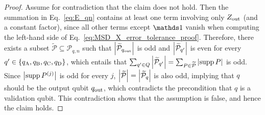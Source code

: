\documentclass[
 prx,
 reprint,
 superscriptaddress,
 longbibliography,
 dvipsnames
]{revtex4-2}
\begin{document}
\begin{proof}
    Assume for contradiction that the claim does not hold.
    Then the summation in Eq.~\eqref{eq:E_qn} contains at least one term involving only $Z_{\mathrm{out}}$ (and a constant factor), since all other terms except $\identity$ vanish when computing the left-hand side of Eq.~\eqref{eq:MSD_X_error_tolerance_proof}.
    Therefore, there exists a subset $\widetilde{\mathcal{P}} \subseteq \mathcal{P}_{q,n}$ such that $\abs{\widetilde{\mathcal{P}}_{q_{\mathrm{out}}}}$ is odd and $\abs{\widetilde{\mathcal{P}}_{q'}}$ is even for every $q' \in \qty{q_{\mathrm{A}}, q_{\mathrm{B}}, q_{\mathrm{C}}, q_{\mathrm{D}}}$, which entails that $\sum_{q' \in Q} \abs{\widetilde{\mathcal{P}}_{q'}} = \sum_{P \in \widetilde{\mathcal{P}}} \abs{\operatorname{supp} P}$ is odd.
    Since $\abs{\operatorname{supp} P^{(j)}}$ is odd for every $j$, $\abs{\widetilde{\mathcal{P}}} = \abs{\widetilde{\mathcal{P}}_{q}}$ is also odd, implying that $q$ should be the output qubit $q_{\mathrm{out}}$, which contradicts the precondition that $q$ is a validation qubit.
    This contradiction shows that the assumption is false, and hence the claim holds.
\end{proof}

\end{document}
